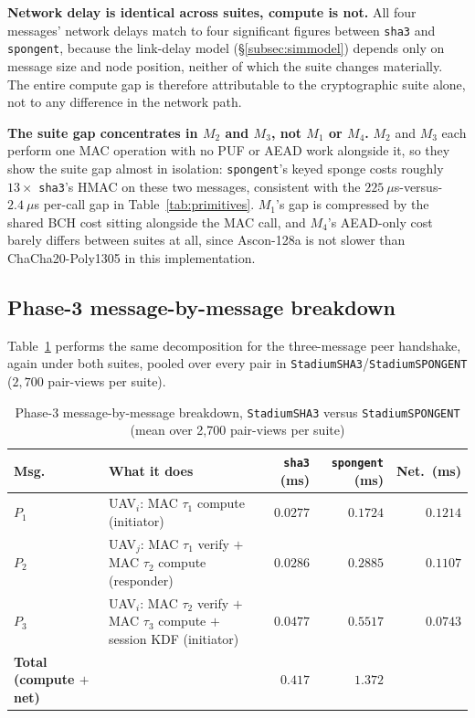 \documentclass[11pt,a4paper]{article}
\begin{document}
\textbf{Network delay is identical across suites, compute is not.} All four
messages' network delays match to four significant figures between
\texttt{sha3} and \texttt{spongent}, because the link-delay model
(\S\ref{subsec:simmodel}) depends only on message size and node position, neither
of which the suite changes materially. The entire compute gap is therefore
attributable to the cryptographic suite alone, not to any difference in the
network path.

\textbf{The suite gap concentrates in $M_2$ and $M_3$, not $M_1$ or $M_4$.} $M_2$
and $M_3$ each perform one MAC operation with no PUF or AEAD work alongside it,
so they show the suite gap almost in isolation: \texttt{spongent}'s keyed sponge
costs roughly $13\times$ \texttt{sha3}'s HMAC on these two messages, consistent
with the $225~\mu$s-versus-$2.4~\mu$s per-call gap in
Table~\ref{tab:primitives}. $M_1$'s gap is compressed by the shared BCH cost sitting
alongside the MAC call, and $M_4$'s AEAD-only cost barely differs between suites at
all, since Ascon-128a is not slower than ChaCha20-Poly1305 in this implementation.

\subsection{Phase-3 message-by-message breakdown}
\label{subsec:phase3_breakdown}

Table~\ref{tab:p3breakdown} performs the same decomposition for the three-message
peer handshake, again under both suites, pooled over every pair in
\texttt{StadiumSHA3}/\texttt{StadiumSPONGENT} ($2{,}700$ pair-views per suite).

\begin{table}[H]
\centering
\caption{Phase-3 message-by-message breakdown, \texttt{StadiumSHA3} versus
\texttt{StadiumSPONGENT} (mean over 2{,}700 pair-views per suite)}
\label{tab:p3breakdown}
\small
\begin{tabular}{@{}p{1.1cm}p{5.4cm}rrr@{}}
\toprule
\textbf{Msg.} & \textbf{What it does} & \textbf{\texttt{sha3} (ms)} &
\textbf{\texttt{spongent} (ms)} & \textbf{Net.\ (ms)} \\
\midrule
$P_1$ & UAV$_i$: MAC $\tau_1$ compute (initiator) & $0.0277$ & $0.1724$ & $0.1214$ \\
$P_2$ & UAV$_j$: MAC $\tau_1$ verify $+$ MAC $\tau_2$ compute (responder) & $0.0286$ & $0.2885$ & $0.1107$ \\
$P_3$ & UAV$_i$: MAC $\tau_2$ verify $+$ MAC $\tau_3$ compute $+$ session KDF (initiator) & $0.0477$ & $0.5517$ & $0.0743$ \\
\midrule
\textbf{Total (compute $+$ net)} & & $\mathbf{0.417}$ & $\mathbf{1.372}$ & \\
\bottomrule
\end{tabular}
\end{table}
\end{document}
